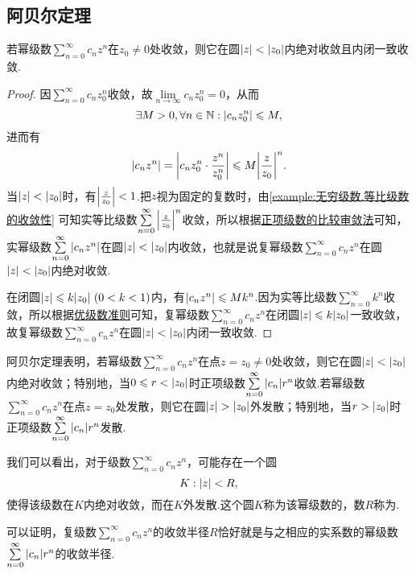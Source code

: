 \subsection{阿贝尔定理}
\begin{theorem}[阿贝尔定理]\label{theorem:解析函数的级数表示.阿贝尔定理}
若幂级数\(\sum\limits_{n=0}^{\infty} c_n z^n\)在\(z_0 \neq 0\)处收敛，则它在圆\(\abs{z} < \abs{z_0}\)内绝对收敛且内闭一致收敛.
\begin{proof}
因\(\sum\limits_{n=0}^{\infty} c_n z_0^n\)收敛，故\(\lim\limits_{n\to\infty} c_n z_0^n = 0\)，从而\[
\exists M > 0, \forall n \in \mathbb{N} : \abs{c_n z_0^n} \leqslant M,
\]进而有\[
\abs{c_n z^n}
= \abs{c_n z_0^n \cdot \frac{z^n}{z_0^n}}
\leqslant M \abs{\frac{z}{z_0}}^n.
\]当\(\abs{z} < \abs{z_0}\)时，有\(\abs{\frac{z}{z_0}} < 1\).把\(z\)视为固定的复数时，由\cref{example:无穷级数.等比级数的收敛性} 可知实等比级数\(\sum\limits_{n=0}^{\infty} \abs{\frac{z}{z_0}}^n\)收敛，所以根据\hyperref[theorem:无穷级数.正项级数的比较审敛法]{正项级数的比较审敛法}可知，实幂级数\(\sum\limits_{n=0}^{\infty} \abs{c_n z^n}\)在圆\(\abs{z} < \abs{z_0}\)内收敛，也就是说复幂级数\(\sum\limits_{n=0}^{\infty} c_n z^n\)在圆\(\abs{z} < \abs{z_0}\)内绝对收敛.

在闭圆\(\abs{z} \leqslant k \abs{z_0}\ (0<k<1)\)内，有\(\abs{c_n z^n} \leqslant M k^n\).因为实等比级数\(\sum\limits_{n=0}^{\infty} k^n\)收敛，所以根据\hyperref[theorem:无穷级数.优级数准则]{优级数准则}可知，复幂级数\(\sum\limits_{n=0}^{\infty} c_n z^n\)在闭圆\(\abs{z} \leqslant k \abs{z_0}\)一致收敛，故复幂级数\(\sum\limits_{n=0}^{\infty} c_n z^n\)在圆\(\abs{z} < \abs{z_0}\)内闭一致收敛.
\end{proof}
\end{theorem}
阿贝尔定理表明，若幂级数\(\sum\limits_{n=0}^{\infty} c_n z^n\)在点\(z = z_0 \neq 0\)处收敛，则它在圆\(\abs{z} < \abs{z_0}\)内绝对收敛；特别地，当\(0 \leqslant r < \abs{z_0}\)时正项级数\(\sum\limits_{n=0}^{\infty} \abs{c_n} r^n\)收敛.若幂级数\(\sum\limits_{n=0}^{\infty} c_n z^n\)在点\(z = z_0\)处发散，则它在圆\(\abs{z} > \abs{z_0}\)外发散；特别地，当\(r > \abs{z_0}\)时正项级数\(\sum\limits_{n=0}^{\infty} \abs{c_n} r^n\)发散.

我们可以看出，对于级数\(\sum\limits_{n=0}^{\infty} c_n z^n\)，可能存在一个圆\[
K: \abs{z} < R,
\]使得该级数在\(K\)内绝对收敛，而在\(K\)外发散.这个圆\(K\)称为该幂级数的，数\(R\)称为.

可以证明，复级数\(\sum\limits_{n=0}^{\infty} c_n z^n\)的收敛半径\(R\)恰好就是与之相应的实系数的幂级数\(\sum\limits_{n=0}^{\infty} \abs{c_n} r^n\)的收敛半径.

